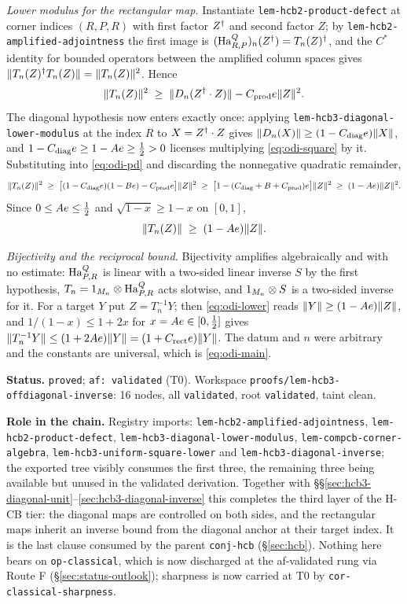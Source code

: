 \emph{Lower modulus for the rectangular map.} Instantiate
\texttt{lem-hcb2-product-defect} at corner indices $(R,P,R)$ with first factor $Z^{\dagger}$ and
second factor $Z$; by \texttt{lem-hcb2-amplified-adjointness} the first image is
$(\mathrm{Ha}^{Q}_{R,P})_n(Z^{\dagger})=T_n(Z)^{\dagger}$, and the $C^*$ identity for bounded operators between
the amplified column spaces gives $\lVert T_n(Z)^{\dagger} T_n(Z)\rVert=\lVert T_n(Z)\rVert^{2}$. Hence
\begin{equation}\label{eq:odi-pd}
  \lVert T_n(Z)\rVert^{2}\;\ge\;\lVert D_n(Z^{\dagger}\mathbin{\cdot} Z)\rVert-C_{\mathrm{prod}}e\lVert Z\rVert^{2}.
\end{equation}
The diagonal hypothesis now enters exactly once: applying
\texttt{lem-hcb3-diagonal-lower-modulus} at the index $R$ to $X=Z^{\dagger}\mathbin{\cdot} Z$ gives
$\lVert D_n(X)\rVert\ge(1-C_{\mathrm{diag}}e)\lVert X\rVert$, and $1-C_{\mathrm{diag}}e\ge
1-Ae\ge\tfrac12>0$ licenses multiplying \eqref{eq:odi-square} by it. Substituting into
\eqref{eq:odi-pd} and discarding the nonnegative quadratic remainder,
\[
  \lVert T_n(Z)\rVert^{2}
  \;\ge\;\bigl[(1-C_{\mathrm{diag}}e)(1-Be)-C_{\mathrm{prod}}e\bigr]\lVert Z\rVert^{2}
  \;\ge\;\bigl[1-(C_{\mathrm{diag}}+B+C_{\mathrm{prod}})e\bigr]\lVert Z\rVert^{2}
  \;\ge\;(1-Ae)\lVert Z\rVert^{2}.
\]
Since $0\le Ae\le\tfrac12$ and $\sqrt{1-x}\ge1-x$ on $[0,1]$,
\begin{equation}\label{eq:odi-lower}
  \lVert T_n(Z)\rVert\;\ge\;(1-Ae)\lVert Z\rVert.
\end{equation}

\emph{Bijectivity and the reciprocal bound.} Bijectivity amplifies algebraically and with
no estimate: $\mathrm{Ha}^{Q}_{P,R}$ is linear with a two-sided linear inverse $S$ by the first
hypothesis, $T_n=1_{M_{n}}\otimes\mathrm{Ha}^{Q}_{P,R}$ acts slotwise, and $1_{M_{n}}\otimes S$ is a two-sided
inverse for it. For a target $Y$ put $Z=T_n^{-1}Y$; then \eqref{eq:odi-lower} reads
$\lVert Y\rVert\ge(1-Ae)\lVert Z\rVert$, and $1/(1-x)\le1+2x$ for $x=Ae\in[0,\tfrac12]$ gives
$\lVert T_n^{-1}Y\rVert\le(1+2Ae)\lVert Y\rVert=(1+C_{\mathrm{rect}}e)\lVert Y\rVert$. The datum and
$n$ were arbitrary and the constants are universal, which is \eqref{eq:odi-main}.

\medskip
\noindent\textbf{Status.} \texttt{proved}; \texttt{af: validated} (T0). Workspace
\texttt{proofs/lem-hcb3-offdiagonal-inverse}: 16 nodes, all \texttt{validated}, root
\texttt{validated}, taint clean.

\noindent\textbf{Role in the chain.} Registry imports:
\texttt{lem-hcb2-amplified-adjointness},
\texttt{lem-hcb2-product-defect},
\texttt{lem-hcb3-diagonal-lower-modulus},
\texttt{lem-compcb-corner-algebra},
\texttt{lem-hcb3-uniform-square-lower} and
\texttt{lem-hcb3-diagonal-inverse}; the exported tree visibly consumes the first three,
the remaining three being available but unused in the validated derivation. Together with
\S\S\ref{sec:hcb3-diagonal-unit}--\ref{sec:hcb3-diagonal-inverse} this completes the
third layer of the H-CB tier: the diagonal maps are controlled on both sides, and the
rectangular maps inherit an inverse bound from the diagonal anchor at their target index.
It is the last clause consumed by the parent \texttt{conj-hcb}
(\S\ref{sec:hcb}). Nothing here bears on \texttt{op-classical}, which is now discharged at the af-validated rung via Route F (\S\ref{sec:status-outlook}); sharpness is now carried at T0 by \texttt{cor-classical-sharpness}.
